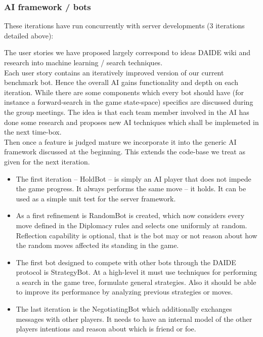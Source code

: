 \documentclass[11pt]{article}
\begin{document}
\subsubsection{AI framework / bots}

These iterations have run concurrently with server developments (3 iterations
detailed above):

The user stories we have proposed largely correspond to ideas DAIDE wiki and
research into machine learning / search techniques. 
\\
Each user story contains an iteratively improved version of our current 
benchmark bot. Hence the overall AI gains functionality and depth on each
iteration. While there are some components which every bot should have (for
instance a forward-search in the game state-space) specifics are discussed 
during the group meetings. The idea is that each team member involved in 
the AI has done some research and proposes new AI techniques which shall be
implemeted in the next time-box.
\\
Then once a feature is judged mature we incorporate it into the generic AI
framework discussed at the beginning. This extends the code-base we treat as 
given for the next iteration. 

\begin{itemize}
\item The first iteration -- HoldBot -- is simply an AI player that does not
      impede the game progress. It always performs the same move -- it holds.
      It can be used as a simple unit test for the server framework.
\item As a first refinement is RandomBot is created, which now considers every
      move defined in the Diplomacy rules and selects one uniformly at random. 
      Reflection capability is optional, that is the bot may or not reason about
      how the random moves affected its standing in the game.
\item The first bot designed to compete with other bots through the DAIDE protocol
      is StrategyBot. At a high-level it must use techniques for performing
      a search in the game tree, formulate general strategies. Also it should be 
      able to improve its performance by analyzing previous strategies or moves.
\item The last iteration is the NegotiatingBot which additionally exchanges 
      messages with other players. It needs to have an internal model of the other
      players intentions and reason about which is friend or foe.
\end{itemize}
\end{document}
